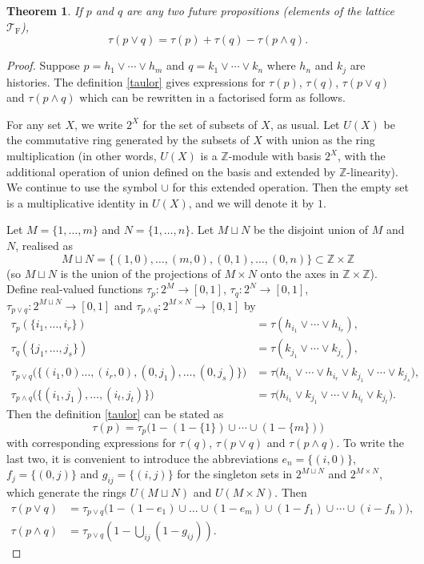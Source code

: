 \documentclass[12pt,reqno]{article}
\renewcommand{\(}{\left(}
\renewcommand{\)}{\right)}
\newcommand{\Z}{\mathbb{Z}}
\newcommand{\TF}{\mathcal{T}_\text{F}}
\newcommand{\<}{\langle}
\renewcommand{\>}{\rangle}
\theoremstyle{plain} %
\newtheorem{thm}{Theorem}
\begin{document}
\begin{thm}\label{disj}
If $p$ and $q$ are any two future propositions (elements of the lattice $\TF$),
\[
\tau(p\lor q) = \tau(p) + \tau(q) - \tau(p\land q).
\]
\end{thm}
\begin{proof}
Suppose $p = h_1\lor\cdots\lor h_m$ and $q = k_1\lor\cdots\lor k_n$ where $h_n$ and $k_j$ are histories. The definition \eqref{taulor} gives expressions for $\tau(p)$, $\tau(q)$, $\tau(p\lor q)$ and $\tau(p\land q)$ which can be rewritten in a factorised form as follows.

For any set $X$, we write $2^X$ for the set of subsets of $X$, as usual. Let $U(X)$ be the commutative ring generated by the subsets of $X$ with union as the ring multiplication (in other words, $U(X)$ is a $\Z$-module with basis $2^X$, with the additional operation of union defined on the basis and extended by $\Z$-linearity). We continue to use the symbol $\cup$ for this extended operation. Then the empty set is a multiplicative identity in $U(X)$, and we will denote it by $1$.  

 Let $M = \{1,\ldots,m\}$ and $N = \{1,\ldots, n\}$. Let $M\sqcup N$ be the disjoint union of $M$ and $N$, realised as
\[
M\sqcup N = \{(1,0),\ldots,(m,0),(0,1),\ldots,(0,n)\} \subset \Z\times\Z
\]
(so $M\sqcup N$ is the union of the projections of $M\times N$ onto the axes in $\Z\times\Z$). Define real-valued functions $\tau_p: 2^M \to [0,1]$, $\tau_q: 2^N\to [0,1]$, $\tau_{p\lor q}:2^{M\sqcup N} \to [0,1]$ and $\tau_{p\land q}:2^{M\times N} \to [0,1]$ by
\begin{align*}
\tau_p(\{i_1,\ldots,i_r\}) &= \tau(h_{i_1}\lor\cdots\lor h_{i_r}),\\
\tau_q(\{j_1,\ldots,j_s\}) &= \tau(k_{j_1}\lor\cdots\lor k_{j_s}),\\
\tau_{p\lor q}\big(\{(i_1,0)\ldots,(i_r,0),(0,j_1),\ldots,(0,j_s)\}\big) &= \tau\big(h_{i_1}\lor\cdots\lor h_{i_r}\lor k_{j_1}\lor\cdots\lor k_{j_s}\big),\\
\tau_{p\land q}\big(\{(i_1,j_1),\ldots,(i_t,j_t)\}\big) &= \tau\big(h_{i_1}\lor k_{j_1}\lor\cdots\lor h_{i_t}\lor k_{j_t}\big).
\end{align*}
Then the definition \eqref{taulor} can be stated as 
\[
\tau(p) = \tau_p\big(1 - (1 - \{1\})\cup\cdots\cup(1 - \{m\})\big)
\]
with corresponding expressions for $\tau(q)$, $\tau(p\lor q)$ and $\tau(p\land q)$. To write the last two, it is convenient to introduce the abbreviations $e_n = \{(i,0)\}$, $f_j = \{(0,j)\}$  and $g_{ij} = \{(i,j)\}$ for the singleton sets in $2^{M\sqcup N}$ and $2^{M\times N}$, which generate the rings $U(M\sqcup N)$ and $U(M\times N)$. Then 
\begin{align*}
\tau(p\lor q) &= \tau_{p\lor q}\big(1 - (1 - e_1)\cup\ldots\cup(1-e_m)\cup(1-f_1)\cup\cdots\cup(i-f_n)\big),\\
\tau(p\land q) &= \tau_{p\lor q}\(1 - \bigcup_{ij}(1 - g_{ij})\).
\end{align*}


\end{proof}
\end{document}
